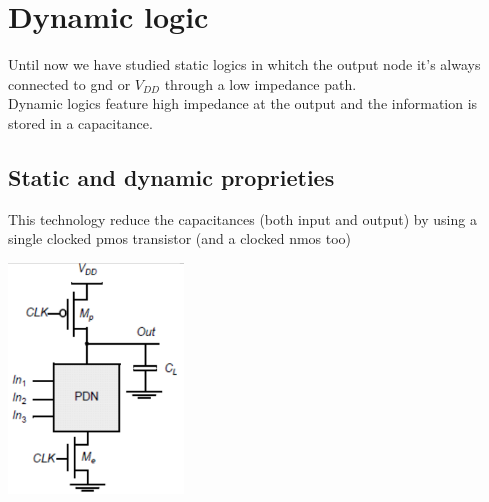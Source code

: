 \chapter{Dynamic logic}
Until now we have studied static logics in whitch the output node it's always connected to gnd or $V_{DD}$ through a low impedance path.\\
Dynamic logics feature high impedance at the output and the information is stored in a capacitance.\\


\section{Static and dynamic proprieties}

This technology reduce the capacitances (both input and output) by using a single clocked pmos transistor (and a clocked nmos too)

\centering
\includegraphics[width=0.35\textwidth]{C9_1.png}\\
\raggedright

